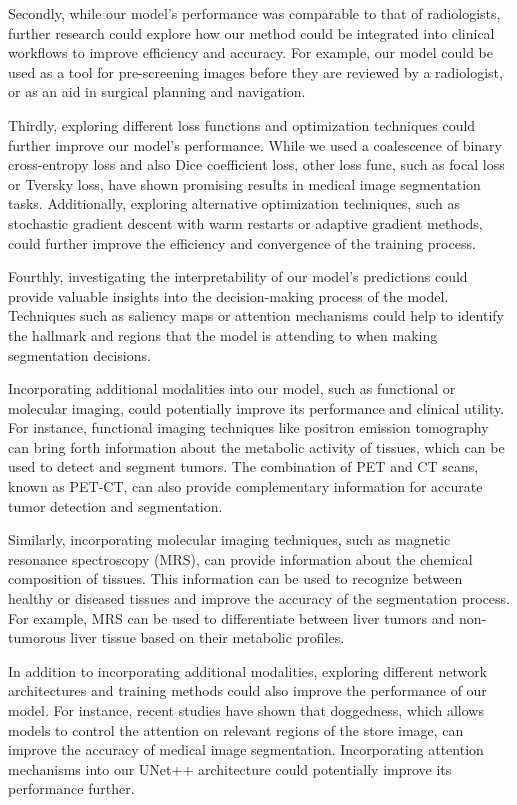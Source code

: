 \documentclass[conference]{IEEEtran}
\begin{document}
Secondly, while our model's performance was comparable to that of radiologists, further research could explore how our method could be integrated into clinical workflows to improve efficiency and accuracy. For example, our model could be used as a tool for pre-screening images before they are reviewed by a radiologist, or as an aid in surgical planning and navigation.

Thirdly, exploring different loss functions and optimization techniques could further improve our model's performance. While we used a coalescence of binary cross-entropy loss and also Dice coefficient loss, other loss func, such as focal loss or Tversky loss, have shown promising results in medical image segmentation tasks. Additionally, exploring alternative optimization techniques, such as stochastic gradient descent with warm restarts or adaptive gradient methods, could further improve the efficiency and convergence of the training process.

Fourthly, investigating the interpretability of our model's predictions could provide valuable insights into the decision-making process of the model. Techniques such as saliency maps or attention mechanisms could help to identify the hallmark and regions that the model is attending to when making segmentation decisions.

Incorporating additional modalities into our model, such as functional or molecular imaging, could potentially improve its performance and clinical utility. For instance, functional imaging techniques like positron emission tomography can bring forth information about the metabolic activity of tissues, which can be used to detect and segment tumors. The combination of PET and CT scans, known as PET-CT, can also provide complementary information for accurate tumor detection and segmentation.

Similarly, incorporating molecular imaging techniques, such as magnetic resonance spectroscopy (MRS), can provide information about the chemical composition of tissues. This information can be used to recognize between healthy or diseased tissues and improve the accuracy of the segmentation process. For example, MRS can be used to differentiate between liver tumors and non-tumorous liver tissue based on their metabolic profiles.

In addition to incorporating additional modalities, exploring different network architectures and training methods could also improve the performance of our model. For instance, recent studies have shown that doggedness, which allows  models to control the attention on relevant regions of the store image, can improve the accuracy of medical image segmentation. Incorporating attention mechanisms into our UNet++ architecture could potentially improve its performance further.
\end{document}
